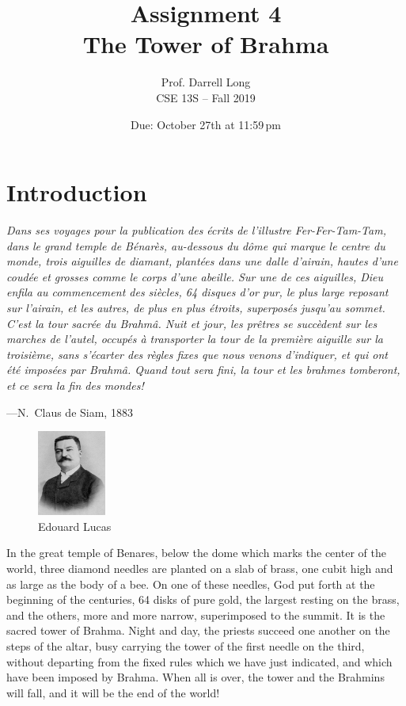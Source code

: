 \documentclass[11pt]{article}
\title{Assignment 4 \\ The Tower of Brahma}
\author{Prof. Darrell Long \\
CSE 13S -- Fall 2019}
\date{Due: October 27th at 11:59\,pm}
\begin{document}
\maketitle

\section{Introduction}
\textwidth
\epigraph{\emph{Dans ses voyages pour la publication des \'ecrits de
l'illustre \emph{Fer-Fer-Tam-Tam}, dans le grand temple de B\'enar\`es,
au-dessous du d\^ome qui marque le centre du monde, trois aiguilles
de diamant, plant\'ees dans une dalle d'airain, hautes d'une coud\'ee
et grosses comme le corps d'une abeille. Sur une de ces aiguilles,
Dieu enfila au commencement des si\`ecles, 64 disques d'or pur, le
plus large reposant sur l'airain, et les autres, de plus en plus
\'etroits, superpos\'es jusqu'au sommet. C'est la tour sacr\'ee du Brahm\^a.
Nuit et jour, les pr\^etres se succ\`edent sur les marches de l'autel,
occup\'es \`a transporter la tour de la premi\`ere aiguille sur la
troisi\`eme, sans s'\'ecarter des r\`egles fixes que nous venons d'indiquer,
et qui ont \'et\'e imposées par Brahm\^a. Quand tout sera fini, la tour
et les brahmes tomberont, et ce sera la fin des mondes!}}{---N.\ Claus de
Siam, 1883}


\begin{figure}
\centering
\includegraphics[width=0.2\textwidth]{Elucas_1}
\caption{Edouard Lucas}
\end{figure}
In the great temple of Benares, below the dome
which marks the center of the world, three diamond needles are planted
on a slab of brass, one cubit high and as large as the body of a
bee. On one of these needles, God put forth at the beginning of the
centuries, 64 disks of pure gold, the largest resting on the brass,
and the others, more and more narrow, superimposed to the summit.
It is the sacred tower of Brahma. Night and day, the priests succeed
one another on the steps of the altar, busy carrying the tower of
the first needle on the third, without departing from the fixed
rules which we have just indicated, and which have been imposed by
Brahma. When all is over, the tower and the Brahmins will fall,
and it will be the end of the world!
\end{document}
